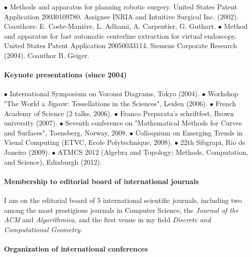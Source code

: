 $\bullet$  Methods and apparatus for planning robotic surgery. 
United States Patent Application 20030109780. Assignee INRIA and
Intuitive Surgical Inc. (2002).  Coauthors: E. Coste-Mani\`ere, L. Adhami,
A. Carpentier, G. Guthart.
$\bullet$  Method and apparatus for fast automatic centerline extraction for virtual 
endoscopy. United States Patent Application  20050033114. Siemens Corporate 
Research (2004). Coauthor B. Geiger.

\paragraph{Keynote presentations (since 2004)}\mbox{}

$\bullet$ International Symposium on Voronoi Diagrams, Tokyo (2004).
$\bullet$  Workshop "The World a Jigsaw: Tessellations in the Sciences", Leiden (2006).
$\bullet$  French Academy of Science (2 talks, 2006). 
$\bullet$  Franco Preparata's schriftfest, Brown university (2007). 
$\bullet$ Seventh conference on "Mathematical Methods for Curves and Surfaces", Toensberg, Norway, 2008. 
$\bullet$  Colloquium on Emerging Trends in Visual Computing (ETVC, Ecole Polytechnique, 2008). 
$\bullet$  22th Sibgrapi, Rio de Janeiro (2009).  
$\bullet$  ATMCS 2012 (Algebra and Topology; Methods, Computation, and Science), Edinburgh (2012).

\paragraph{Membership to editorial board of international journals}   \mbox{}


I am on the editorial board of 5 international scientific journals, including two among the most prestigious  journals in Computer Science, the {\em Journal of the ACM} and  {\em Algorithmica}, and the first venue in my field {\em Discrete and Computational Geometry}. 




\paragraph{Organization of international conferences} \mbox{}

